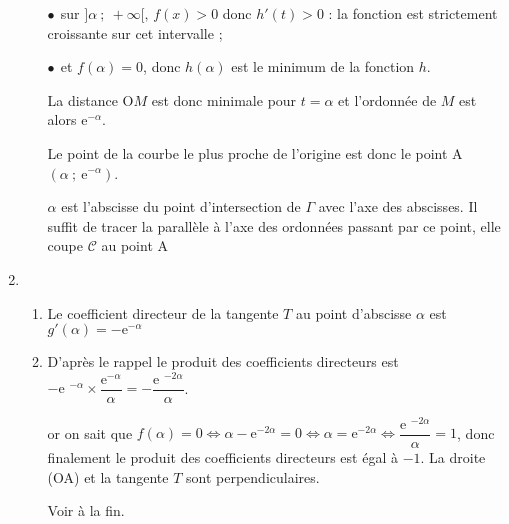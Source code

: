 \begin{enumerate}
\begin{enumerate}
$\bullet~~$sur $]\alpha~;~+ \infty[, \, f(x) > 0$ donc $h'(t) > 0$ : la fonction est strictement croissante sur cet intervalle ;

$\bullet~~$et $f(\alpha) = 0$, donc $h(\alpha)$ est le minimum de la fonction $h$.

La distance O$M$ est donc minimale pour $t = \alpha$ et l'ordonnée de $M$ est alors $\text{e}^{- \alpha}$.

Le point de la courbe le plus proche de l'origine est donc le point A$\left(\alpha~;~\text{e}^{-\alpha}\right)$.

$\alpha$ est l'abscisse du point d'intersection de $\Gamma$ avec l'axe des abscisses. Il suffit de tracer la parallèle à l'axe des ordonnées passant par ce point, elle coupe $\mathcal{C}$ au point A
	\end{enumerate}
\item %
	\begin{enumerate}
		\item %
Le coefficient directeur de la tangente $T$ au point d'abscisse $\alpha$ est $g'(\alpha) = - \text{e}^{- \alpha}$		
%
%

		\item %
D'après le rappel le produit des coefficients directeurs est $- \text{e }^{-\alpha} \times \dfrac{\text{e}^{-\alpha}}{\alpha} = -\dfrac{\text{e }^{-2\alpha}}{\alpha}$.

or on sait que $f(\alpha) = 0 \iff \alpha - \text{e}^{-2\alpha} = 0 \iff \alpha = \text{e}^{-2\alpha} \iff \dfrac{\text{e }^{-2\alpha}}{\alpha} = 1$, donc finalement le produit des coefficients directeurs est égal à $- 1$. La droite (OA) et la tangente $T$ sont perpendiculaires.

Voir à la fin.
	\end{enumerate}
\end{enumerate}

